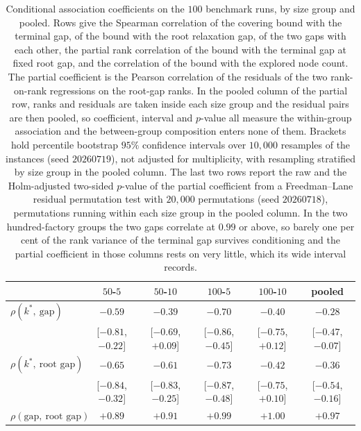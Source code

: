 \begin{table}[H]
\centering
\caption{Conditional association coefficients on the $100$ benchmark runs, by
size group and pooled. Rows give the Spearman correlation of the covering
bound with the terminal gap, of the bound with the root relaxation gap, of the
two gaps with each other, the partial rank correlation of the bound with the
terminal gap at fixed root gap, and the correlation of the bound with the
explored node count. The partial coefficient is the Pearson correlation of the
residuals of the two rank-on-rank regressions on the root-gap ranks. In
the pooled column of the partial row, ranks and residuals are taken
inside each size group and the residual pairs are then pooled, so
coefficient, interval and $p$-value all measure the within-group
association and the between-group composition enters none of them.
Brackets hold
percentile bootstrap $95\%$ confidence intervals over
$10{,}000$ resamples of the instances (seed $20260719$), not adjusted for
multiplicity, with resampling stratified by size group in the pooled
column. The last two rows report the raw and the
Holm-adjusted
two-sided $p$-value of the partial coefficient from a Freedman--Lane residual
permutation test with $20{,}000$ permutations (seed $20260718$), permutations
running within each size group in the pooled column. In the two
hundred-factory groups the two gaps correlate at $0.99$
or above, so barely one per cent of the rank variance of the terminal gap
survives conditioning and the partial coefficient in those columns rests on
very little, which its wide interval records.}
\label{tab:q3mediation}
\small
\setlength{\tabcolsep}{3pt}
\begin{tabular}{lccccc}
\hline
 & $50$-$5$ & $50$-$10$ & $100$-$5$ & $100$-$10$ & pooled \\
\hline
$\rho(k^\ast,\ \text{gap})$ & $-0.59$ & $-0.39$ & $-0.70$ & $-0.40$ & $-0.28$ \\
 & {\scriptsize [$-0.81$, $-0.22$]} & {\scriptsize [$-0.69$, $+0.09$]} & {\scriptsize [$-0.86$, $-0.45$]} & {\scriptsize [$-0.75$, $+0.12$]} & {\scriptsize [$-0.47$, $-0.07$]} \\[2pt]
$\rho(k^\ast,\ \text{root gap})$ & $-0.65$ & $-0.61$ & $-0.73$ & $-0.42$ & $-0.36$ \\
 & {\scriptsize [$-0.84$, $-0.32$]} & {\scriptsize [$-0.83$, $-0.25$]} & {\scriptsize [$-0.87$, $-0.48$]} & {\scriptsize [$-0.75$, $+0.10$]} & {\scriptsize [$-0.54$, $-0.16$]} \\[2pt]
$\rho(\text{gap},\ \text{root gap})$ & $+0.89$ & $+0.91$ & $+0.99$ & $+1.00$ & $+0.97$ \\

\end{tabular}
\end{table}
